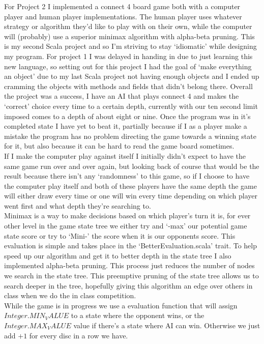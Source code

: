 \documentclass[12pt,fleqn,leqno,letterpaper]{article}
\begin{document}
For Project 2 I implemented a connect 4 board game both with a computer player and human player implementations. The human player uses whatever strategy or algorithm they'd like to play with on their own, while the computer will (probably) use a superior minimax algorithm with alpha-beta pruning. This is my second Scala project and so I'm striving to stay `idiomatic' while designing my program. For project 1 I was delayed in handing in due to just learning this new language, so setting out for this project I had the goal of `make everything an object' due to my last Scala project not having enough objects and I ended up cramming the objects with methods and fields that didn't belong there. Overall the project was a success, I have an AI that plays connect 4 and makes the `correct' choice every time to a certain depth, currently with our ten second limit imposed comes to a depth of about eight or nine. Once the program was in it's completed state I have yet to beat it, partially because if I as a player make a mistake the program has no problem directing the game towards a winning state for it, but also because it can be hard to read the game board sometimes.\\

If I make the computer play against itself I initially didn't expect to have the same game run over and over again, but looking back of course that would be the result because there isn't any `randomness' to this game, so if I choose to have the computer play itself and both of these players have the same depth the game will either draw every time or one will win every time depending on which player went first and what depth they're searching to.\\

Minimax is a way to make decisions based on which player's turn it is, for ever other level in the game state tree we either try and `-max'  our potential game state score or try to `Mini-' the score when it is our opponents score. This evaluation is simple and takes place in the `BetterEvaluation.scala' trait. To help speed up our algorithm and get it to better depth in the state tree I also implemented alpha-beta pruning. This process just reduces the number of nodes we search in the state tree. This preemptive pruning of the state tree allows us to search deeper in the tree, hopefully giving this algorithm an edge over others in class when we do the in class competition.\\

While the game is in progress we use a evaluation function that will assign $Integer.MIN_VALUE$ to a state where the opponent wins, or the $Integer.MAX_VALUE$ value if there's a state where AI can win. Otherwise we just add $+1$ for every disc in a row we have.\\
\end{document}
